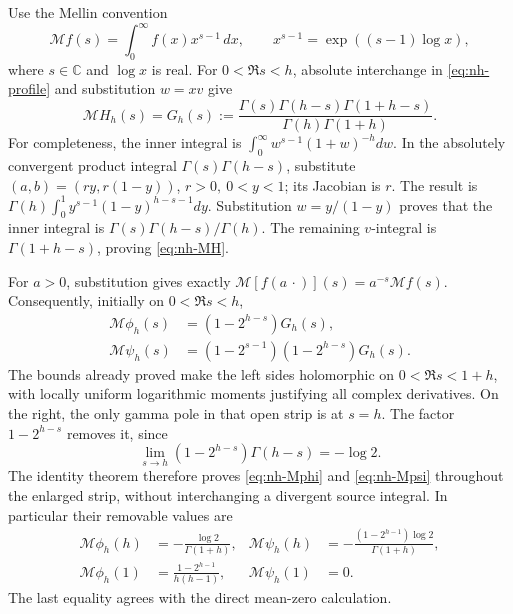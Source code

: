 Use the Mellin convention
\[
 \mathcal M f(s)=\int_0^\infty f(x)x^{s-1}\,dx,\qquad
 x^{s-1}=\exp((s-1)\log x),
\]
where \(s\in\mathbb C\) and \(\log x\) is real.
For \(0<\Re s<h\), absolute interchange in \eqref{eq:nh-profile}
and substitution \(w=xv\) give
\begin{equation}\label{eq:nh-MH}
 \mathcal M H_h(s)=
 G_h(s):=\frac{\Gamma(s)\Gamma(h-s)\Gamma(1+h-s)}
                    {\Gamma(h)\Gamma(1+h)} .
\end{equation}
For completeness, the inner integral is
\(\int_0^\infty w^{s-1}(1+w)^{-h}dw\).
In the absolutely convergent product integral
\(\Gamma(s)\Gamma(h-s)\), substitute
\((a,b)=(ry,r(1-y))\), \(r>0,\ 0<y<1\); its Jacobian is \(r\).
The result is \(\Gamma(h)\int_0^1y^{s-1}(1-y)^{h-s-1}dy\).
Substitution \(w=y/(1-y)\) proves that the inner integral is
\(\Gamma(s)\Gamma(h-s)/\Gamma(h)\). The remaining \(v\)-integral
is \(\Gamma(1+h-s)\), proving \eqref{eq:nh-MH}.

For \(a>0\), substitution gives exactly
\(\mathcal M[f(a\,\cdot)](s)=a^{-s}\mathcal M f(s)\).
Consequently, initially on \(0<\Re s<h\),
\begin{align}
 \mathcal M\phi_h(s)&=(1-2^{h-s})G_h(s),\label{eq:nh-Mphi}\\
 \mathcal M\psi_h(s)&=(1-2^{s-1})(1-2^{h-s})G_h(s).
 \label{eq:nh-Mpsi}
\end{align}
The bounds already proved make the left sides holomorphic on
\(0<\Re s<1+h\), with locally uniform logarithmic moments justifying
all complex derivatives. On the right, the only gamma pole in that open
strip is at \(s=h\). The factor \(1-2^{h-s}\) removes it, since
\[
 \lim_{s\to h}(1-2^{h-s})\Gamma(h-s)=-\log2.
\]
The identity theorem therefore proves \eqref{eq:nh-Mphi} and
\eqref{eq:nh-Mpsi} throughout the enlarged strip, without interchanging
a divergent source integral. In particular their removable values are
\begin{align}
 \mathcal M\phi_h(h)&=-\frac{\log2}{\Gamma(1+h)},&
 \mathcal M\psi_h(h)&=
 -\frac{(1-2^{h-1})\log2}{\Gamma(1+h)},\label{eq:nh-values-h}\\
 \mathcal M\phi_h(1)&=
 \frac{1-2^{h-1}}{h(h-1)},&
 \mathcal M\psi_h(1)&=0.\label{eq:nh-values-one}
\end{align}
The last equality agrees with the direct mean-zero calculation.

